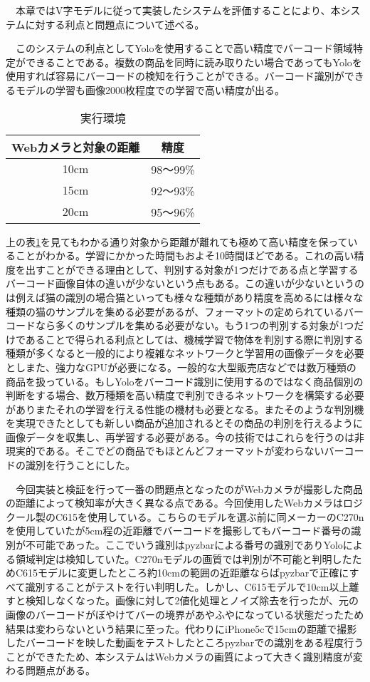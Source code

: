 　本章ではV字モデルに従って実装したシステムを評価することにより、本システムに対する利点と問題点について述べる。

　このシステムの利点としてYoloを使用することで高い精度でバーコード領域特定ができることである。複数の商品を同時に読み取りたい場合であってもYoloを使用すれば容易にバーコードの検知を行うことができる。バーコード識別ができるモデルの学習も画像2000枚程度での学習で高い精度が出る。

\begin{table}[htb]
\begin{center}
\caption{実行環境}
\begin{tabular}{|c|c|} \hline
Webカメラと対象の距離 & 精度\\ \hline
10cm & 98～99\% \\ \hline
15cm & 92～93\% \\ \hline
20cm & 95～96\% \\ \hline
\end{tabular}
\label{accurancy}
	\end{center}
\end{table}

 上の表\ref{accurancy}を見てもわかる通り対象から距離が離れても極めて高い精度を保っていることがわかる。学習にかかった時間もおよそ10時間ほどである。これの高い精度を出すことができる理由として、判別する対象が1つだけである点と学習するバーコード画像自体の違いが少ないという点もある。この違いが少ないというのは例えば猫の識別の場合猫といっても様々な種類があり精度を高めるには様々な種類の猫のサンプルを集める必要があるが、フォーマットの定められているバーコードなら多くのサンプルを集める必要がない。もう1つの判別する対象が1つだけであることで得られる利点としては、機械学習で物体を判別する際に判別する種類が多くなると一般的により複雑なネットワークと学習用の画像データを必要としまた、強力なGPUが必要になる。一般的な大型販売店などでは数万種類の商品を扱っている。もしYoloをバーコード識別に使用するのではなく商品個別の判断をする場合、数万種類を高い精度で判別できるネットワークを構築する必要がありまたそれの学習を行える性能の機材も必要となる。またそのような判別機を実現できたとしても新しい商品が追加されるとその商品の判別を行えるように画像データを収集し、再学習する必要がある。今の技術ではこれらを行うのは非現実的である。そこでどの商品でもほとんどフォーマットが変わらないバーコードの識別を行うことにした。

　今回実装と検証を行って一番の問題点となったのがWebカメラが撮影した商品の距離によって検知率が大きく異なる点である。今回使用したWebカメラはロジクール製のC615を使用している。こちらのモデルを選ぶ前に同メーカーのC270nを使用していたが5cm程の近距離でバーコードを撮影してもバーコード番号の識別が不可能であった。ここでいう識別はpyzbarによる番号の識別でありYoloによる領域判定は検知していた。C270nモデルの画質では判別が不可能と判明したためC615モデルに変更したところ約10cmの範囲の近距離ならばpyzbarで正確にすべて識別することがテストを行い判明した。しかし、C615モデルで10cm以上離すと検知しなくなった。画像に対して2値化処理とノイズ除去を行ったが、元の画像のバーコードがぼやけてバーの境界があやふやになっている状態だったため結果は変わらないという結果に至った。代わりにiPhone5cで15cmの距離で撮影したバーコードを映した動画をテストしたところpyzbarでの識別をある程度行うことができたため、本システムはWebカメラの画質によって大きく識別精度が変わる問題点がある。